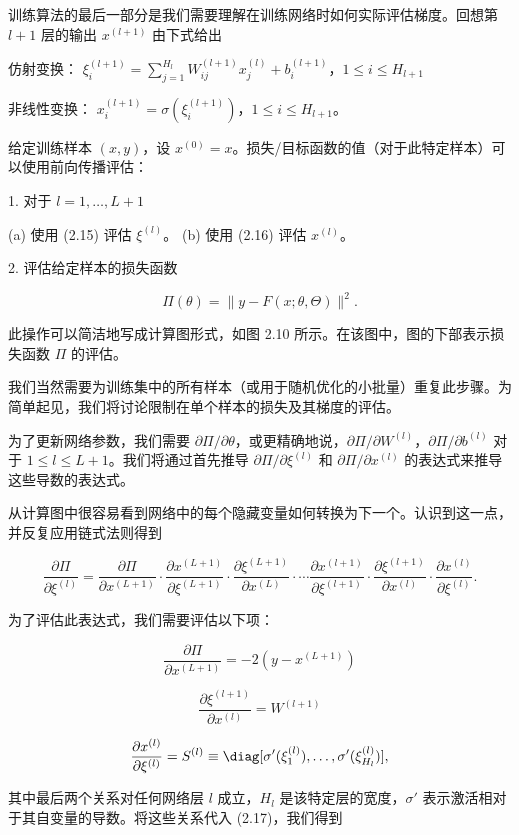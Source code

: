 训练算法的最后一部分是我们需要理解在训练网络时如何实际评估梯度。回想第 $l+1$ 层的输出 $x^{(l+1)}$ 由下式给出

仿射变换： $\xi^{(l+1)}_i = \sum_{j=1}^{H_l} W^{(l+1)}_{ij} x^{(l)}_j + b^{(l+1)}_i$，$1 \leq i \leq H_{l+1}$

非线性变换： $x^{(l+1)}_i = \sigma( \xi^{(l+1)}_i )$，$1 \leq i \leq H_{l+1}$。

给定训练样本 $(x, y)$，设 $x^{(0)} = x$。损失/目标函数的值（对于此特定样本）可以使用前向传播评估：

1. 对于 $l = 1, \dots, L+1$

(a) 使用 (2.15) 评估 $\xi^{(l)}$。
(b) 使用 (2.16) 评估 $x^{(l)}$。

2. 评估给定样本的损失函数

\[
\Pi(\theta) = \| y - F(x; \theta, \Theta) \|^2.
\]

此操作可以简洁地写成计算图形式，如图 2.10 所示。在该图中，图的下部表示损失函数 $\Pi$ 的评估。

我们当然需要为训练集中的所有样本（或用于随机优化的小批量）重复此步骤。为简单起见，我们将讨论限制在单个样本的损失及其梯度的评估。

为了更新网络参数，我们需要 $\partial \Pi / \partial \theta$，或更精确地说，$\partial \Pi / \partial W^{(l)}$，$\partial \Pi / \partial b^{(l)}$ 对于 $1 \leq l \leq L+1$。我们将通过首先推导 $\partial \Pi / \partial \xi^{(l)}$ 和 $\partial \Pi / \partial x^{(l)}$ 的表达式来推导这些导数的表达式。

从计算图中很容易看到网络中的每个隐藏变量如何转换为下一个。认识到这一点，并反复应用链式法则得到

\[
\frac{\partial \Pi}{\partial \xi^{(l)}} = \frac{\partial \Pi}{\partial x^{(L+1)}} \cdot \frac{\partial x^{(L+1)}}{\partial \xi^{(L+1)}} \cdot \frac{\partial \xi^{(L+1)}}{\partial x^{(L)}} \cdot \cdots \frac{\partial x^{(l+1)}}{\partial \xi^{(l+1)}} \cdot \frac{\partial \xi^{(l+1)}}{\partial x^{(l)}} \cdot \frac{\partial x^{(l)}}{\partial \xi^{(l)}}.
\]

为了评估此表达式，我们需要评估以下项：

\[
\frac{\partial \Pi}{\partial x^{(L+1)}} = -2 (y - x^{(L+1)})
\]

\[
\frac{\partial \xi^{(l+1)}}{\partial x^{(l)}} = W^{(l+1)}
\]

\[
\frac{\partial x^{(l)}}{\partial \xi^{(l)}} = S^{(l)} \equiv \diag[ \sigma'(\xi^{(l)}_1), \dots, \sigma'(\xi^{(l)}_{H_l}) ],
\]

其中最后两个关系对任何网络层 $l$ 成立，$H_l$ 是该特定层的宽度，$\sigma'$ 表示激活相对于其自变量的导数。将这些关系代入 (2.17)，我们得到

